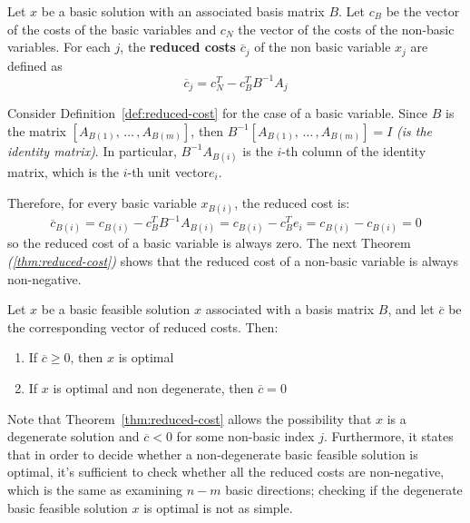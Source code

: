 \documentclass[english]{article}
\begin{document}
\begin{definition}
  Let \(x\) be a basic solution with an associated basis matrix \(B\).
  Let \(c_B\) be the vector of the costs of the basic variables and \(c_N\) the vector of the costs of the non-basic variables.
  For each \(j\), the \textbf{reduced costs} \(\overline{c}_j\) of the non basic variable \(x_j\) are defined as
  \[ \overline{c}_j = c^T_N - c^T_B B^{-1} A_j \]
  \label{def:reduced-cost}
\end{definition}

\bigskip
Consider Definition~\ref{def:reduced-cost} for the case of a basic variable.
Since \(B\) is the matrix \(\left[ A_{B(1)}, \, \ldots \,, A_{B(m)} \right]\), then \(B^{-1}[A_{B(1)}, \, \ldots \,, A_{B(m)}] = I\) \textit{(is the identity matrix)}.
In particular, \(B^{-1} A_{B(i)}\) is the \(i\)-th column of the identity matrix, which is the \(i\)-th unit vector\(e_i\).

Therefore, for every basic variable \(x_{B(i)}\), the reduced cost is:
\[ \overline{c}_{B(i)} = c_{B(i)} - c^T_B B^{-1} A_{B(i)} = c_{B(i)} - c^T_B e_i = c_{B(i)} -  c_{B(i)} = 0 \]
so the reduced cost of a basic variable is always zero.
The next Theorem \textit{(\ref{thm:reduced-cost})} shows that the reduced cost of a non-basic variable is always non-negative.

\begin{theorem}
  Let \(x\) be a basic feasible solution \(x\) associated with a basis matrix \(B\), and let \(\overline{c}\) be the corresponding vector of reduced costs.
  Then:

  \begin{enumerate}
    \item If \(\overline{c} \geq 0\), then \(x\) is optimal
    \item If \(x\) is optimal and non degenerate, then \(\overline{c} = 0\)
  \end{enumerate}
  \label{thm:reduced-cost}
\end{theorem}

\bigskip
Note that Theorem~\ref{thm:reduced-cost} allows the possibility that \(x\) is a degenerate solution and \(\overline{c} < 0\) for some non-basic index \(j\).
Furthermore, it states that in order to decide whether a non-degenerate basic feasible solution is optimal, it's sufficient to check whether all the reduced costs are non-negative, which is the same as examining \(n-m\) basic directions;
checking if the degenerate basic feasible solution \(x\) is optimal is not as simple.
\end{document}
